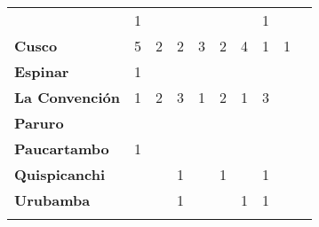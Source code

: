 \begin{tabular}{lccccccccc}
	&1
	&\cellcolor[HTML]{FCC46C}					&\cellcolor[HTML]{FCC46C}
	&\cellcolor[HTML]{FCC46C}					&\cellcolor[HTML]{FCC46C}
	&\cellcolor[HTML]{FCC46C}					&1
	&\cellcolor[HTML]{FCC46C}\\
	\textbf{Cusco}                            													
	&5											
	&2											&2		
	&3											&2
	&4											&1
	&1\\								
	\textbf{Espinar}       					             									
	&1											&\cellcolor[HTML]{FCC46C}
	&\cellcolor[HTML]{FCC46C}					&\cellcolor[HTML]{FCC46C}
	&\cellcolor[HTML]{FCC46C}					&\cellcolor[HTML]{FCC46C}
	&\cellcolor[HTML]{FCC46C}					&\cellcolor[HTML]{FCC46C}\\	
	\textbf{La Convención}                      					
	&1											&2											&3											
	&1											&2											
	&1											&3
	&\cellcolor[HTML]{FCC46C}\\	
	\textbf{Paruro}                            					
	&\cellcolor[HTML]{FCC46C}					&\cellcolor[HTML]{FCC46C}					&\cellcolor[HTML]{FCC46C}					&\cellcolor[HTML]{FCC46C}					&\cellcolor[HTML]{FCC46C}					&\cellcolor[HTML]{FCC46C}
	&\cellcolor[HTML]{FCC46C} 					&\cellcolor[HTML]{FCC46C}\\
	\textbf{Paucartambo}               		                       							
	&1
	&\cellcolor[HTML]{FCC46C}					&\cellcolor[HTML]{FCC46C}
	&\cellcolor[HTML]{FCC46C}					&\cellcolor[HTML]{FCC46C}
	&\cellcolor[HTML]{FCC46C}					&\cellcolor[HTML]{FCC46C}
	&\cellcolor[HTML]{FCC46C}\\
	\textbf{Quispicanchi}                                         	      					
	&\cellcolor[HTML]{FCC46C}					&\cellcolor[HTML]{FCC46C}					&1											&\cellcolor[HTML]{FCC46C}					&1											&\cellcolor[HTML]{FCC46C}					&1
	&\cellcolor[HTML]{FCC46C}\\
	\textbf{Urubamba}                                                      	
	&\cellcolor[HTML]{FCC46C}					&\cellcolor[HTML]{FCC46C}					&1											&\cellcolor[HTML]{FCC46C}					&\cellcolor[HTML]{FCC46C}					&1											
	&1											&\cellcolor[HTML]{FCC46C}\\						
	&\multicolumn{1}{l}{}                       &\multicolumn{1}{l}{}            &\multicolumn{1}{l}{}                         
	&\multicolumn{1}{l}{}                       &\multicolumn{1}{l}{}            &\multicolumn{1}{l}{}                       &\multicolumn{1}{l}{}                       &\multicolumn{1}{l}{}            			    
\end{tabular}